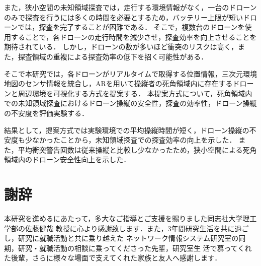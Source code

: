 \documentclass[a4paper,11pt]{ujreport}
\begin{document}
また，狭小空間の未知領域探査では，走行する環境情報がなく，一台のドローンのみで探査を行うには多くの時間を必要とするため，バッテリー上限が短いドローンでは，探査を完了することが困難である．
そこで，複数台のドローンを使用することで，各ドローンの走行時間を減少させ，探査効率を向上させることを期待されている．
しかし，ドローンの数が多いほど衝突のリスクは高く，また，探査領域の重複による探査効率の低下を招く可能性がある．

そこで本研究では，各ドローンがリアルタイムで取得する位置情報，三次元環境地図のセンサ情報を統合し，ARを用いて操縦者の死角領域内に存在するドローンと周辺環境を可視化する方式を提案する．
本提案方式について，死角領域内での未知領域探査におけるドローン操縦の安全性，探査の効率性，ドローン操縦の不安度を評価実験する．

結果として，提案方式では実験環境での平均操縦時間が短く，ドローン操縦の不安度も少なかったことから，未知領域探査での探査効率の向上を示した．
また，平均衝突警告回数は従来操縦と比較し少なかったため，狭小空間による死角領域内のドローン安全性向上を示した．\\

\clearpage

\chapter*{謝辞}
\label{chap:Acknowledgments}

本研究を進めるにあたって，多大なご指導とご支援を賜りました同志社大学理工学部の佐藤健哉
教授に心より感謝致します．また，3年間研究生活を共に過ごし，研究に就職活動と共に乗り越えた
ネットワーク情報システム研究室の同期，研究・就職活動の相談に乗ってくださった先輩，研究室生
活で慕ってくれた後輩，さらに様々な場面で支えてくれた家族と友人へ感謝します．
\clearpage


\renewcommand{\bibname}{参考文献}
\end{document}
